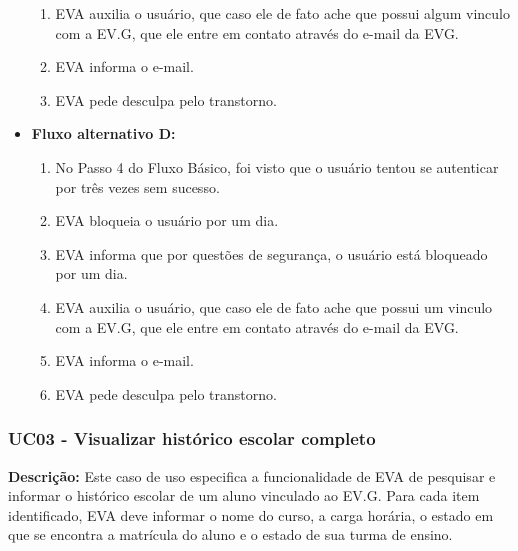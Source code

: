 \begin{itemize}
\begin{enumerate}
            \item EVA auxilia o usuário, que caso ele de fato ache que possui algum vinculo com a EV.G, que ele entre em contato através do e-mail da EVG.
            \item EVA informa o e-mail.
            \item EVA pede desculpa pelo transtorno.
        \end{enumerate}
    \item \textbf{Fluxo alternativo D:}
        \begin{enumerate}
            \item No Passo 4 do Fluxo Básico, foi visto que o usuário tentou se autenticar por três vezes sem sucesso.
            \item EVA bloqueia o usuário por um dia.
            \item EVA informa que por questões de segurança, o usuário está bloqueado por um dia.
            \item EVA auxilia o usuário, que caso ele de fato ache que possui um vinculo com a EV.G, que ele entre em contato através do e-mail da EVG.
            \item EVA informa o e-mail.
            \item EVA pede desculpa pelo transtorno.
        \end{enumerate}
\end{itemize}

\subsubsection{UC03 - Visualizar histórico escolar completo}
\textbf{Descrição:} Este caso de uso especifica a funcionalidade de EVA de pesquisar e informar o histórico escolar de um aluno vinculado ao EV.G. Para cada item identificado, EVA deve informar o nome do curso, a carga horária, o estado em que se encontra a matrícula do aluno e o estado de sua turma de ensino. 

